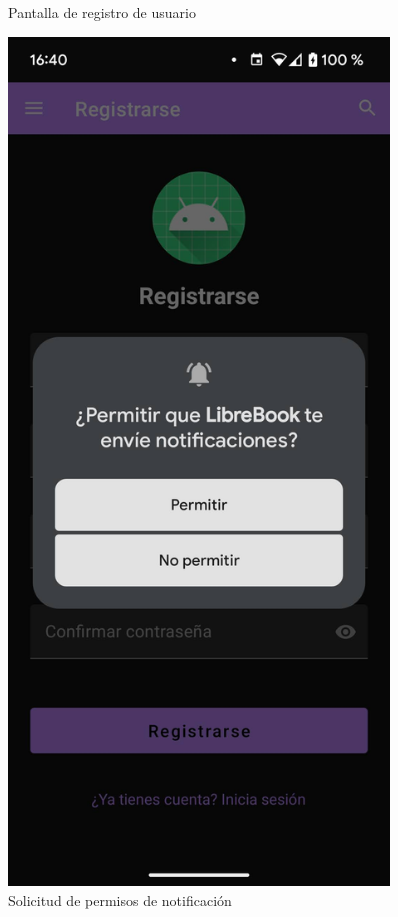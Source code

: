 \documentclass[a4paper,12pt]{report}
\begin{document}
\begin{minipage}{0.25\textwidth}
\begin{figure}[H]
          \caption{Pantalla de registro de usuario}
          \label{fig:pantalla-registro}
        \end{figure}
      \end{minipage}
      \hfill
      \begin{minipage}{0.25\textwidth}
        \begin{figure}[H]
          \centering
          \includegraphics[width=0.9\textwidth]{.img/registro-perm.png}
          \caption{Solicitud de permisos de notificación}
          \label{fig:registro-perm}
        \end{figure}
      \end{minipage}
\end{document}
